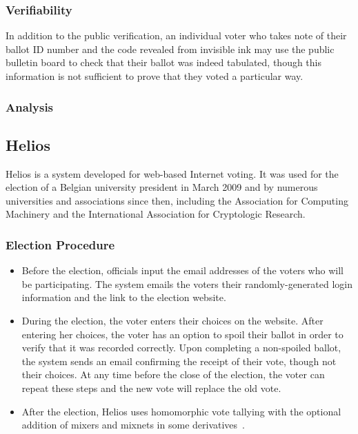 \subsubsection{Verifiability}

In addition to the public verification, an individual voter who takes
note of their ballot ID number and the code revealed from invisible
ink may use the public bulletin board to check that their ballot was
indeed tabulated, though this information is not sufficient to prove
that they voted a particular way.

\subsubsection{Analysis}


\subsection{Helios~\cite{adida2008,adida2009}}

Helios is a system developed for web-based Internet voting. It was
used for the election of a Belgian university president in March 2009
and by numerous universities and associations since then, including
the Association for Computing Machinery and the International
Association for Cryptologic Research.

\subsubsection{Election Procedure}

\begin{itemize}

\item Before the election, officials input the email addresses of the
  voters who will be participating. The system emails the voters their
  randomly-generated login information and the link to the election
  website.

\item During the election, the voter enters their choices on the
  website. After entering her choices, the voter has an option to
  spoil their ballot in order to verify that it was recorded
  correctly. Upon completing a non-spoiled ballot, the system sends an
  email confirming the receipt of their vote, though not their
  choices. At any time before the close of the election, the voter can
  repeat these steps and the new vote will replace the old vote.

\item After the election, Helios uses homomorphic vote tallying with
  the optional addition of mixers and mixnets in some
  derivatives~\cite{bulens2011,tsoukalas2013}.

\end{itemize}

